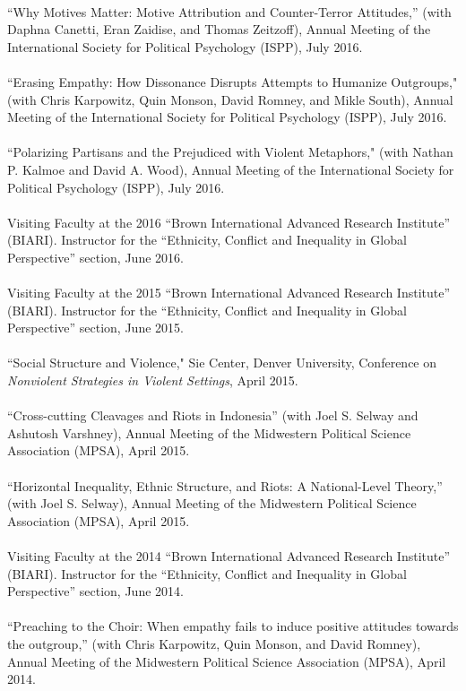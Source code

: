 \documentclass[10pt]{article}
\begin{document}
\ \\
``Why Motives Matter: Motive Attribution and Counter-Terror Attitudes,'' (with Daphna Canetti, Eran Zaidise, and Thomas Zeitzoff), Annual Meeting of the International Society for Political Psychology (ISPP), July 2016.\\
\ \\
``Erasing Empathy: How Dissonance Disrupts Attempts to Humanize Outgroups," (with Chris Karpowitz, Quin Monson, David Romney, and Mikle South), Annual Meeting of the International Society for Political Psychology (ISPP), July 2016.\\
\ \\
``Polarizing Partisans and the Prejudiced with Violent Metaphors," (with Nathan P. Kalmoe and David A. Wood), Annual Meeting of the International Society for Political Psychology (ISPP), July 2016.\\
\ \\
Visiting Faculty at the 2016 ``Brown International Advanced Research Institute'' (BIARI).  Instructor for the ``Ethnicity, Conflict and Inequality in Global Perspective'' section, June 2016.\\
\ \\
Visiting Faculty at the 2015 ``Brown International Advanced Research Institute'' (BIARI).  Instructor for the ``Ethnicity, Conflict and Inequality in Global Perspective'' section, June 2015.\\
\ \\
``Social Structure and Violence," Sie Center, Denver University, Conference on \textit{Nonviolent Strategies in Violent Settings}, April 2015.\\
\ \\
``Cross-cutting Cleavages and Riots in Indonesia'' (with Joel S. Selway and Ashutosh Varshney), Annual Meeting of the Midwestern Political Science Association (MPSA), April 2015. \\
\ \\
``Horizontal Inequality, Ethnic Structure, and Riots: A National-Level Theory,'' (with Joel S. Selway), Annual Meeting of the Midwestern Political Science Association (MPSA), April 2015. \\
\ \\
Visiting Faculty at the 2014 ``Brown International Advanced Research Institute'' (BIARI).  Instructor for the ``Ethnicity, Conflict and Inequality in Global Perspective'' section, June 2014.\\
\ \\
``Preaching to the Choir: When empathy fails to induce positive attitudes towards the outgroup,'' (with Chris Karpowitz, Quin Monson, and David Romney), Annual Meeting of the Midwestern Political Science Association (MPSA), April 2014.\\
\end{document}
